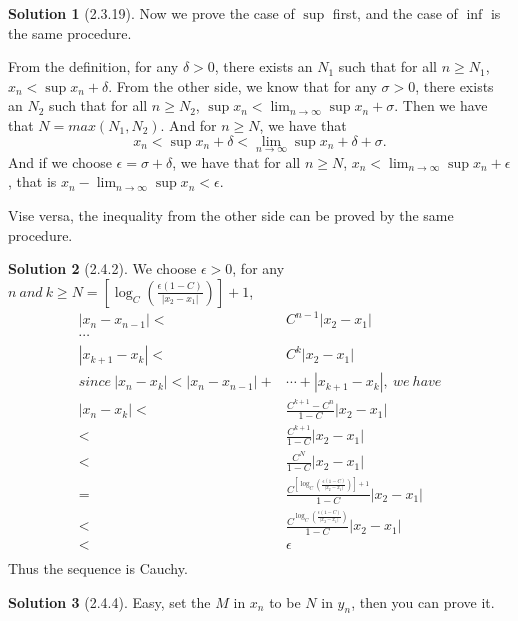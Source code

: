 \documentclass{article}
\theoremstyle{definition}
\newtheorem{sol}{Solution}[exe]
\begin{document}
\begin{sol}[2.3.19]

    Now we prove the case of $\sup$ first, and the case of $\inf$ is the same procedure.

    From the definition, for any $\delta>0$, there exists an $N_{1}$ such that for all $n\geq N_{1}$, $x_{n}<\sup x_{n}+\delta$. From the other side, we know that for any $\sigma>0$, there exists an $N_{2}$ such that for all $n\geq N_{2}$, $\sup x_{n}<\lim_{n\to\infty}\sup x_{n}+\sigma$. Then we have that $N=max(N_{1},N_{2})$.
And for $n\geq N$, we have that
$$x_{n}<\sup x_{n}+\delta<\lim_{n\to\infty}\sup x_{n}+\delta+\sigma.$$
And if we choose $\epsilon=\sigma+\delta$, we have that for all $n\geq N$, $x_{n}<\lim_{n\to\infty}\sup x_{n}+\epsilon$, that is $x_{n}-\lim_{n\to\infty}\sup x_{n}<\epsilon$.

Vise versa, the inequality from the other side can be proved by the same procedure.

\end{sol}

\begin{sol}[2.4.2]
We choose $\epsilon>0$, for any $n\ and\ k\geq N=[\log_{C}(\frac{\epsilon(1-C)}{|x_{2}-x_{1}|})]+1$,
    \begin{align*}
        |x_{n}-x_{n-1}|<&C^{n-1}|x_{2}-x_{1}|\\
        \cdots\\
        |x_{k+1}-x_{k}|<&C^{k}|x_{2}-x_{1}|\\
        since\ |x_{n}-x_{k}|<|x_{n}-x_{n-1}|+&\cdots+|x_{k+1}-x_{k}|,\ we\ have\\
        |x_{n}-x_{k}|<&\frac{C^{k+1}-C^{n}}{1-C}|x_{2}-x_{1}|\\
        <&\frac{C^{k+1}}{1-C}|x_{2}-x_{1}|\\
        <&\frac{C^{N}}{1-C}|x_{2}-x_{1}|\\
        =&\frac{C^{[\log_{C}(\frac{\epsilon(1-C)}{|x_{2}-x_{1}|})]+1}}{1-C}|x_{2}-x_{1}|\\
        <&\frac{C^{\log_{C}(\frac{\epsilon(1-C)}{|x_{2}-x_{1}|})}}{1-C}|x_{2}-x_{1}|\\
        <&\epsilon\\
    \end{align*}
Thus the sequence is Cauchy.
\end{sol}


\begin{sol}[2.4.4]
Easy, set the $M$ in $x_{n}$ to be $N$ in $y_{n}$, then you can prove it.
\end{sol}
\end{document}
